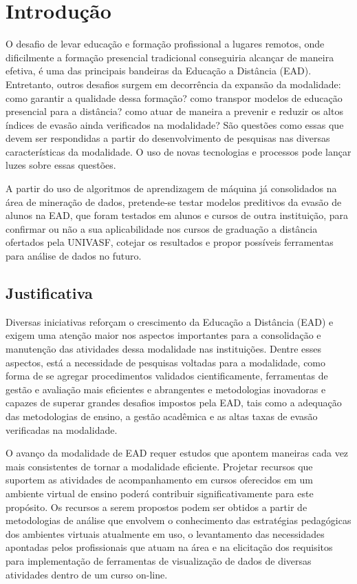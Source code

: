 \chapter{Introdução}

O desafio de levar educação e formação profissional a lugares remotos, onde
dificilmente a formação presencial tradicional conseguiria alcançar de maneira
efetiva, é uma das principais bandeiras da Educação a Distância (EAD).
Entretanto, outros desafios surgem em decorrência da expansão da modalidade:
como garantir a qualidade dessa formação? como transpor modelos de educação
presencial para a distância? como atuar de maneira a prevenir e reduzir os altos
índices de evasão ainda verificados na modalidade? São questões como essas que
devem ser respondidas a partir do desenvolvimento de pesquisas nas diversas
características da modalidade. O uso de novas tecnologias e processos pode
lançar luzes sobre essas questões.

A partir do uso de algoritmos de aprendizagem de máquina já consolidados na área
de mineração de dados, pretende-se testar modelos preditivos da evasão de alunos
na EAD, que foram testados em alunos e cursos de outra instituição, para
confirmar ou não a sua aplicabilidade nos cursos de graduação a distância
ofertados pela UNIVASF, cotejar os resultados e propor possíveis ferramentas
para análise de dados no futuro.

\section{Justificativa}

Diversas iniciativas reforçam o crescimento da Educação a Distância (EAD) e
exigem uma atenção maior nos aspectos importantes para a consolidação e
manutenção das atividades dessa modalidade nas instituições. Dentre esses
aspectos, está a necessidade de pesquisas voltadas para a modalidade, como forma
de se agregar procedimentos validados cientificamente, ferramentas de gestão e
avaliação mais eficientes e abrangentes e metodologias inovadoras e capazes de
superar grandes desafios impostos pela EAD, tais como a adequação das
metodologias de ensino, a gestão acadêmica e as altas taxas de evasão
verificadas na modalidade.

O avanço da modalidade de EAD requer estudos que apontem maneiras cada vez mais
consistentes de tornar a modalidade eficiente. Projetar recursos que suportem as
atividades de acompanhamento em cursos oferecidos em um ambiente virtual de
ensino poderá contribuir significativamente para este propósito. Os recursos a
serem propostos podem ser obtidos a partir de metodologias de análise que
envolvem o conhecimento das estratégias pedagógicas dos ambientes virtuais
atualmente em uso, o levantamento das necessidades apontadas pelos profissionais
que atuam na área e na elicitação dos requisitos para implementação de
ferramentas de visualização de dados de diversas atividades dentro de um curso
on-line.

